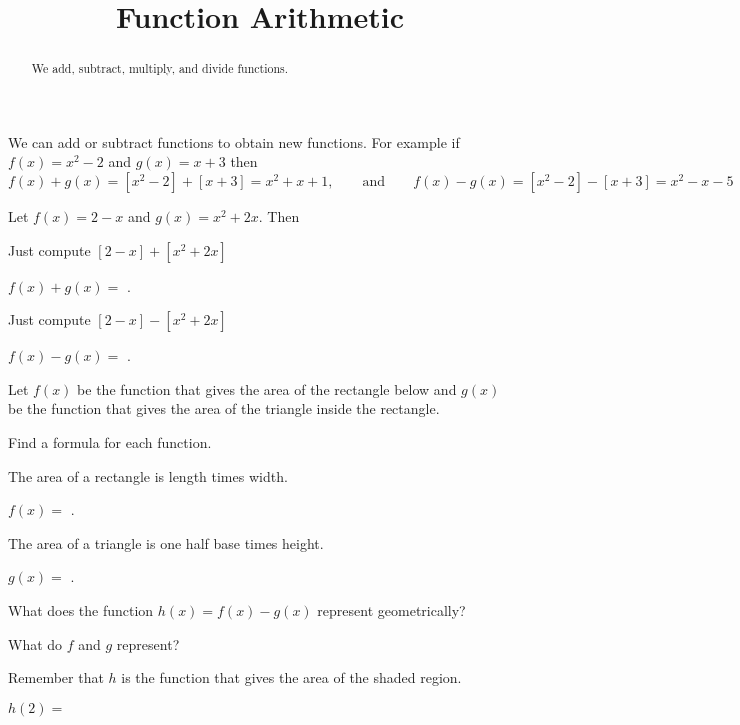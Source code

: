 \documentclass{ximera}
\title{Function Arithmetic}
\begin{document}
\begin{abstract}
We add, subtract, multiply, and divide functions.
\end{abstract}
\maketitle


We can add or subtract functions to obtain new functions. For example if $f(x)=x^2-2$ and $g(x)=x+3$ then 
\[
f(x)+g(x)=[x^2-2]+[x+3]=x^2+x+1,\qquad\text{and}\qquad f(x)-g(x)=[x^2-2]-[x+3]=x^2-x-5
\]

\begin{question}
Let $f(x)=2-x$ and $g(x)=x^2+2x$. Then

\begin{hint}
Just compute $[2-x]+[x^2+2x]$
\end{hint}
$f(x)+g(x)=$ .

\begin{hint}
Just compute $[2-x]-[x^2+2x]$
\end{hint}
$f(x)-g(x)=$ .

\end{question}

\begin{question}
Let $f(x)$ be the function that gives the area of the rectangle below and $g(x)$ be the function that gives the area of the triangle inside the rectangle. 
\begin{image}
\end{image}

Find a formula for each function.


\begin{hint}
The area of a rectangle is length times width.
\end{hint}
$f(x)=$ .

\begin{hint}
The area of a triangle is one half base times height.
\end{hint}
$g(x)=$ .

What does the function $h(x)=f(x)-g(x)$ represent geometrically?
\begin{hint}
What do $f$ and $g$ represent? 
\end{hint}
\begin{multipleChoice}
\end{multipleChoice}

\begin{hint}
Remember that $h$ is the function that gives the area of the shaded region. 
\end{hint}
$h(2)=$ 
\end{question}
\end{document}
